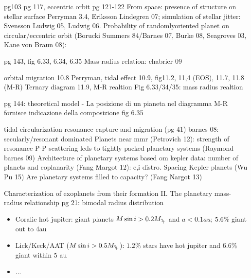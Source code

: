 \begin{workout}
pg103
pg 117, eccentric orbit pg 121-122
From space: presence of structure on stellar surface Perryman 3.4, Eriksson Lindegren 07; simulation of stellar jitter: Svensson Ludwig 05, Ludwig 06.
Probability of randomlyoriented planet on circular/eccentric orbit (Borucki Summers 84/Barnes 07, Burke 08,  Seagroves 03, Kane von Braun 08):
\end{workout}

\begin{workout}
pg 143, fig 6.33, 6.34, 6.35
Mass-radius relation: chabrier 09
\end{workout}

\begin{workout}[M-R diagram]
orbital migration 10.8 Perryman, tidal effect 10.9, 
fig11.2, 11,4 (EOS), 11.7, 11.8 (M-R)
Ternary diagram 11.9, M-R realtion
Fig 6.33/34/35: mass radius realtion

pg 144: theoretical model - La posizione di un pianeta nel diagramma M-R fornisce indicazione della composizione
fig 6.35
\end{workout}

\begin{workout}
\end{workout}

\begin{workout}
tidal circularization
resonance capture and migration (pg 41)
barnes 08: secularly/resonant dominated
Planets near mmr (Petrovich 12): strength of resonance
P-P scattering leds to tightly packed planetary systems (Raymond barnes 09)
Architecture of planetary systems based om kepler data: number of planets and coplanarity (Fang Margot 12): e,i distro.
Spacing Kepler planets (Wu Pu 15)
Are planetary systems filled to capacity? (Fang Nargot 13)
\end{workout}

\begin{workout}
	Characterization of exoplanets from their formation II. The planetary mass-radius relationship pg 21: bimodal radius distribution
\end{workout}

\begin{workout}
	\begin{itemize}
	\item Coralie hot jupiter: giant planets $M\sin{i}>0.2\mjupiter$ and $a<0.1au$; $5.6\%$ giant out to 4au
	\item Lick/Keck/AAT ($M\sin{i}>0.5\mjupiter$): $1.2\%$ stars have hot jupiter and $6.6\%$ giant within 5 au
	\item ...
\end{itemize}
\end{workout}

